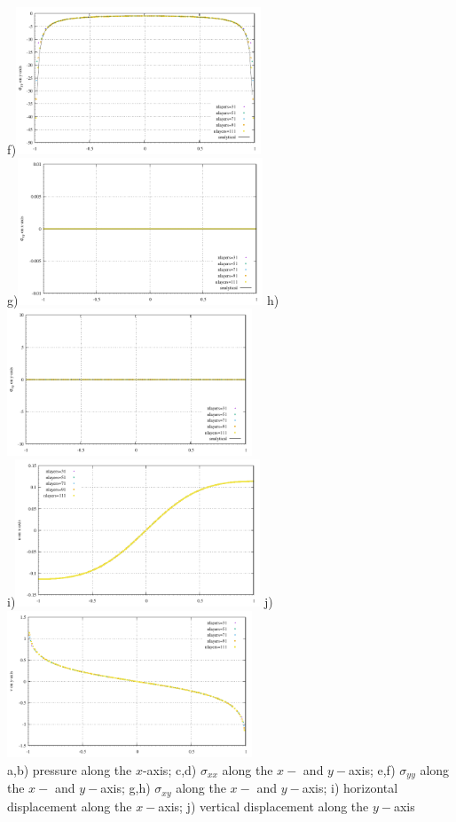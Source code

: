 \begin{center}
f)\includegraphics[width=7.3cm]{python_codes/fieldstone_58/experiment1/sigmayy_yaxis.pdf}\\
g)\includegraphics[width=7.3cm]{python_codes/fieldstone_58/experiment1/sigmaxy_xaxis.pdf}
h)\includegraphics[width=7.3cm]{python_codes/fieldstone_58/experiment1/sigmaxy_yaxis.pdf}\\
i)\includegraphics[width=7.3cm]{python_codes/fieldstone_58/experiment1/u_xaxis.pdf}
j)\includegraphics[width=7.3cm]{python_codes/fieldstone_58/experiment1/v_yaxis.pdf}\\
{\captionfont a,b) pressure along the $x$-axis;
c,d) $\sigma_{xx}$  along the $x-$ and $y-$axis; 
e,f) $\sigma_{yy}$  along the $x-$ and $y-$axis; 
g,h) $\sigma_{xy}$  along the $x-$ and $y-$axis; 
i) horizontal displacement along the $x-$axis; 
j) vertical displacement along the $y-$axis}
\end{center}

